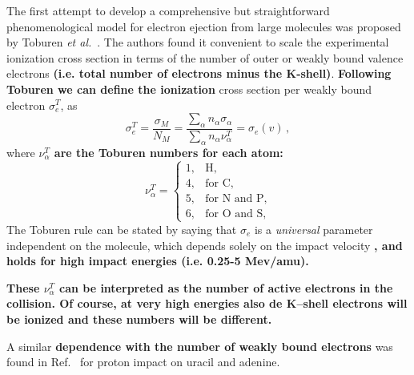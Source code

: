 \documentclass[preprint,12pt]{article}
\begin{document}
The first attempt to develop a comprehensive but straightforward
phenomenological model for electron ejection from large molecules was
proposed by Toburen {\it et al.}~\cite{toburen1975,toburen1976}.
The authors found it convenient to scale the experimental ionization
cross section in terms of the number of outer or weakly bound valence
electrons \textbf{(i.e. total number of electrons minus the K-shell)}.
\textbf{Following Toburen we can define the ionization} cross section per weakly bound electron
$\sigma_{e}^T$, as
\begin{equation}
\sigma_{e}^T=\frac{\sigma_{M}}{N_{M}}=\frac{\sum\limits_{\alpha}
n_{\alpha} \sigma_{\alpha}}{\sum\limits_{\alpha}n_{\alpha}\nu_{\alpha}^T}
=\sigma_{e}(v)\,,
\label{27}
\end{equation}
where \textbf{$\nu_{\alpha}^T$ are the Toburen numbers for each atom:}
\begin{equation}
\nu_{\alpha}^T=\left\{
\begin{array}{ll}
1, & \text{H,} \\
4, & \text{for C,} \\
5, & \text{for N and P,} \\
6, & \text{for O and S,}
\end{array}\right.
\label{eq:nelec}
\end{equation}
The Toburen rule can be stated by saying that
$\sigma_{e}$ is a \textit{universal} parameter independent on the
molecule, which depends solely on the impact velocity\textbf{
, and holds for high impact energies (i.e. 0.25-5 Mev/amu).}

\textbf{
These $\nu_{\alpha}^T$ can be interpreted as the number of active 
electrons in the collision. Of course, at very high energies also de 
K--shell electrons will be ionized and these numbers will be different. }

A similar \textbf{dependence with the number of weakly bound electrons} was found in
Ref.~\cite{itoh2013} for proton impact on uracil and adenine.
\end{document}
